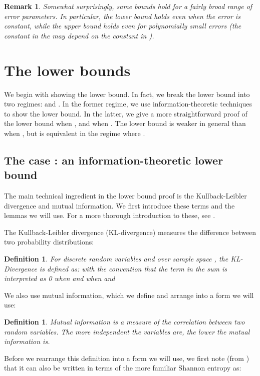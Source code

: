 \documentclass[12pt]{article}
\newtheorem{remark}[theorem]{Remark}
\newtheorem{mydef}[theorem]{Definition}
\begin{document}
\begin{remark}
Somewhat surprisingly, same bounds hold for a fairly broad range of error parameters. In particular, the lower bound holds even when the error is constant, while the upper bound
holds even for polynomially small errors (the constant in the  may depend on the constant  in ). 
\end{remark}



\section{The lower bounds}




We begin with showing the lower bound. In fact, we break the lower bound into two regimes:  and . In 
the former regime, we use information-theoretic techniques to show the lower bound. In the latter, we give a more straightforward
proof of the  lower bound when , and  when . The  
lower bound is weaker in general than   when , but is equivalent in the regime where . 


\subsection{The case : an information-theoretic lower bound} \label{sec:lowerbound}


The main technical ingredient in the lower bound proof is the Kullback-Leibler divergence and mutual information. We first introduce these terms and the lemmas we will use. For a more thorough introduction to these, see \cite{Cover}.

The Kullback-Leibler divergence (KL-divergence) measures the difference between two probability distributions:
\begin{mydef} 
For discrete random variables  and  over sample space , the KL-Divergence is defined as:  with the convention that the term in the sum is interpreted as 0 when  and  when  and  
\end{mydef}

We also use mutual information, which we define and arrange into a form we will use:
\begin{mydef}
Mutual information is a measure of the correlation between two random variables. The more independent the variables are, the lower the mutual information is. 

\end{mydef}

Before we rearrange this definition into a form we will use, we first note (from \cite{Cover}) that it can also be written in terms of the more familiar Shannon entropy as:
\end{document}
